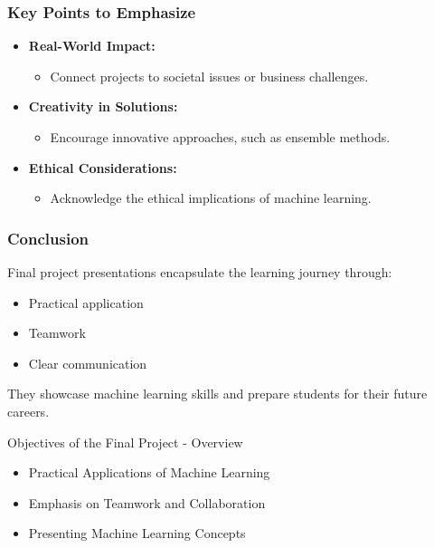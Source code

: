 \documentclass[aspectratio=169]{beamer}
\begin{document}
\begin{frame}[fragile]
    \frametitle{Key Points to Emphasize}
    \begin{itemize}
        \item \textbf{Real-World Impact:} 
            \begin{itemize}
                \item Connect projects to societal issues or business challenges.
            \end{itemize}

        \item \textbf{Creativity in Solutions:}
            \begin{itemize}
                \item Encourage innovative approaches, such as ensemble methods.
            \end{itemize}

        \item \textbf{Ethical Considerations:} 
            \begin{itemize}
                \item Acknowledge the ethical implications of machine learning.
            \end{itemize}
    \end{itemize}
\end{frame}

\begin{frame}[fragile]
    \frametitle{Conclusion}
    Final project presentations encapsulate the learning journey through:
    \begin{itemize}
        \item Practical application
        \item Teamwork
        \item Clear communication
    \end{itemize}
    They showcase machine learning skills and prepare students for their future careers.
\end{frame}

\begin{frame}[fragile]{Objectives of the Final Project - Overview}
    \begin{itemize}
        \item Practical Applications of Machine Learning
        \item Emphasis on Teamwork and Collaboration
        \item Presenting Machine Learning Concepts
    \end{itemize}
\end{frame}
\end{document}
